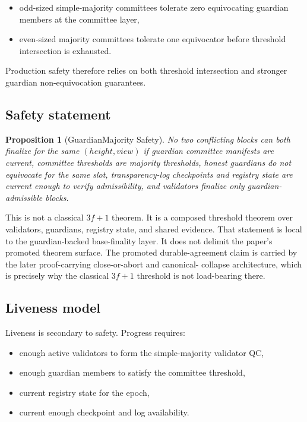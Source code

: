 \documentclass[11pt]{article}
\newtheorem{proposition}{Proposition}
\begin{document}
\begin{itemize}[leftmargin=1.5em]
\item odd-sized simple-majority committees tolerate zero equivocating guardian
members at the committee layer,
\item even-sized majority committees tolerate one equivocator before threshold
intersection is exhausted.
\end{itemize}

Production safety therefore relies on both threshold intersection and stronger
guardian non-equivocation guarantees.

\subsection{Safety statement}

\begin{proposition}[GuardianMajority Safety]
No two conflicting blocks can both finalize for the same \((height, view)\) if
guardian committee manifests are current, committee thresholds are majority
thresholds, honest guardians do not equivocate for the same slot,
transparency-log checkpoints and registry state are current enough to verify
admissibility, and validators finalize only guardian-admissible blocks.
\end{proposition}

This is not a classical \(3f + 1\) theorem. It is a composed threshold theorem
over validators, guardians, registry state, and shared evidence. That
statement is local to the guardian-backed base-finality layer. It does not
delimit the paper's promoted theorem surface. The promoted durable-agreement
claim is carried by the later proof-carrying close-or-abort and canonical-
collapse architecture, which is precisely why the classical \(3f + 1\)
threshold is not load-bearing there.

\subsection{Liveness model}

Liveness is secondary to safety. Progress requires:

\begin{itemize}[leftmargin=1.5em]
\item enough active validators to form the simple-majority validator QC,
\item enough guardian members to satisfy the committee threshold,
\item current registry state for the epoch,
\item current enough checkpoint and log availability.
\end{itemize}
\end{document}
